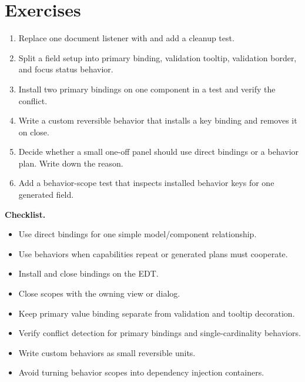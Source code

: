 \section{Exercises}

\begin{exercisebox}
\begin{enumerate}
\item Replace one document listener with  and add
a cleanup test.
\item Split a field setup into primary binding, validation tooltip, validation
border, and focus status behavior.
\item Install two primary bindings on one component in a test and verify the
conflict.
\item Write a custom reversible behavior that installs a key binding and
removes it on close.
\item Decide whether a small one-off panel should use direct bindings or a
behavior plan. Write down the reason.
\item Add a behavior-scope test that inspects installed behavior keys for one
generated field.
\end{enumerate}
\end{exercisebox}

\textbf{Checklist.}

\begin{itemize}
\item Use direct bindings for one simple model/component relationship.
\item Use behaviors when capabilities repeat or generated plans must cooperate.
\item Install and close bindings on the EDT.
\item Close scopes with the owning view or dialog.
\item Keep primary value binding separate from validation and tooltip
decoration.
\item Verify conflict detection for primary bindings and single-cardinality
behaviors.
\item Write custom behaviors as small reversible units.
\item Avoid turning behavior scopes into dependency injection containers.
\end{itemize}
